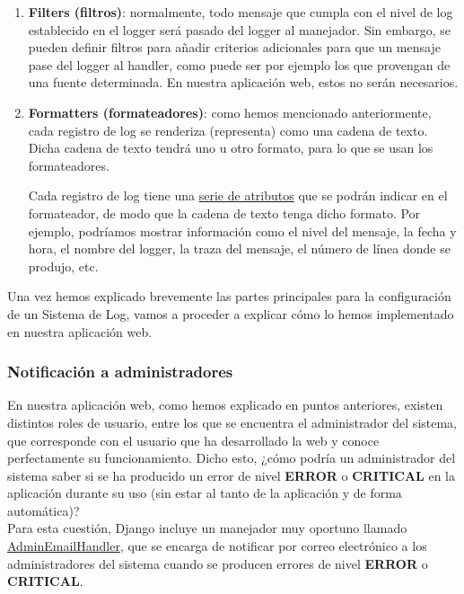 \begin{enumerate}
        \item \textbf{Filters (filtros)}: normalmente, todo mensaje que cumpla con el
        nivel de log establecido en el logger será pasado del logger al manejador. Sin
        embargo, se pueden definir filtros para añadir criterios adicionales para que un
        mensaje pase del logger al handler, como puede ser por ejemplo los que provengan
        de una fuente determinada. En nuestra aplicación web, estos no serán necesarios.

        \item \textbf{Formatters (formateadores)}: como hemos mencionado anteriormente,
        cada registro de log se renderiza (representa) como una cadena de texto. Dicha
        cadena de texto tendrá uno u otro formato, para lo que se usan los formateadores.
        
        Cada registro de log tiene una 
        \href{https://docs.python.org/3/library/logging.html#logrecord-attributes}{serie
        de atributos}  que se podrán indicar en el formateador, de modo que la cadena de
        texto tenga dicho formato. Por ejemplo, podríamos mostrar información como el
        nivel del mensaje, la fecha y hora, el nombre del logger, la traza del mensaje,
        el número de línea donde se produjo, etc.
    \end{enumerate}

Una vez hemos explicado brevemente las partes principales para la configuración de un
Sistema de Log, vamos a proceder a explicar cómo lo hemos implementado en nuestra
aplicación web.

\subsubsection{Notificación a administradores}
En nuestra aplicación web, como hemos explicado en puntos anteriores, existen distintos
roles de usuario, entre los que se encuentra el administrador del sistema, que corresponde
con el usuario que ha desarrollado la web y conoce perfectamente su funcionamiento. Dicho
esto, ¿cómo podría un administrador del sistema saber si se ha producido un error de
nivel \textbf{ERROR} o \textbf{CRITICAL} en la aplicación durante su uso (sin estar al
tanto de la aplicación y de forma automática)? \\

Para esta cuestión, Django incluye un manejador muy oportuno llamado
\href{https://docs.djangoproject.com/en/4.0/ref/logging/#django.utils.log.AdminEmailHandler}
{AdminEmailHandler}, que se encarga de notificar por correo electrónico a los
administradores del sistema cuando se producen errores de nivel \textbf{ERROR} o
\textbf{CRITICAL}. \\

